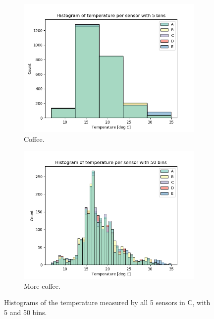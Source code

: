 \documentclass[whitelogo]{tudelft-report}
\begin{document}
\begin{figure}[h!]
  \centering
  \begin{subfigure}[b]{0.4\linewidth}
    \includegraphics[width=\linewidth]{Histogram of temperature per sensor with 5 bins.png}
    \caption{Coffee.}
  \end{subfigure}
  \begin{subfigure}[b]{0.4\linewidth}
    \includegraphics[width=\linewidth]{Histogram of temperature per sensor with 50 bins.png}
    \caption{More coffee.}
  \end{subfigure}
  \caption{Histograms of the temperature measured by all 5 sensors in \degree C, with 5 and 50 bins.}
  \label{fig:hist5and50}
\end{figure}
\end{document}
